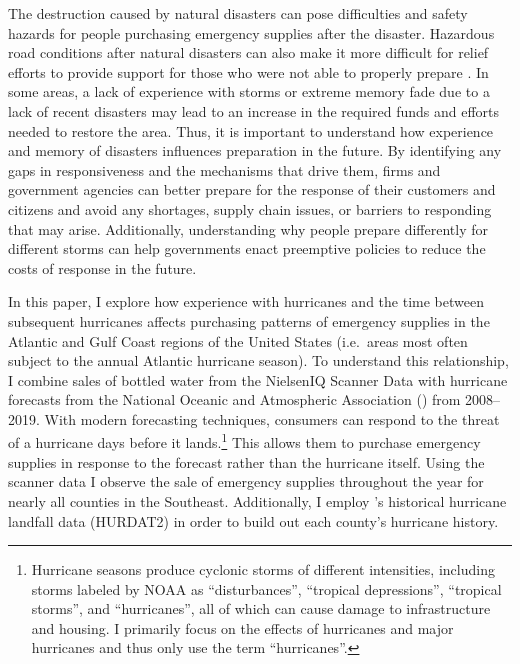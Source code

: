\documentclass{article}
\begin{document}
The destruction caused by natural disasters can pose difficulties and safety hazards for people purchasing emergency supplies after the disaster. Hazardous road conditions after natural disasters can also make it more difficult for relief efforts to provide support for those who were not able to properly prepare \citep{horner2011effects}. In some areas, a lack of experience with storms or extreme memory fade due to a lack of recent disasters may lead to an increase in the required funds and efforts needed to restore the area. Thus, it is important to understand how experience and memory of disasters influences preparation in the future. By identifying any gaps in responsiveness and the mechanisms that drive them, firms and government agencies can better prepare for the response of their customers and citizens and avoid any shortages, supply chain issues, or barriers to responding that may arise. Additionally, understanding why people prepare differently for different storms can help governments enact preemptive policies to reduce the costs of response in the future. 

In this paper, I explore how experience with hurricanes and the time between subsequent hurricanes affects purchasing patterns of emergency supplies in the Atlantic and Gulf Coast regions of the United States (i.e.\ areas most often subject to the annual Atlantic hurricane season). To understand this relationship, I combine sales of bottled water from the NielsenIQ Scanner Data with hurricane forecasts from the National Oceanic and Atmospheric Association (\citeauthor{NOAAGIS}) from 2008--2019. With modern forecasting techniques, consumers can respond to the threat of a hurricane days before it lands.\footnote{Hurricane seasons produce cyclonic storms of different intensities, including storms labeled by NOAA as ``disturbances'', ``tropical depressions'', ``tropical storms'', and ``hurricanes'', all of which can cause damage to infrastructure and housing. I primarily focus on the effects of hurricanes and major hurricanes and thus only use the term ``hurricanes''.} This allows them to purchase emergency supplies in response to the forecast rather than the hurricane itself. Using the scanner data I observe the sale of emergency supplies throughout the year for nearly all counties in the Southeast. Additionally, I employ \citeauthor{HURDAT2}'s  historical hurricane landfall data (HURDAT2) in order to build out each county's hurricane history.
\end{document}
